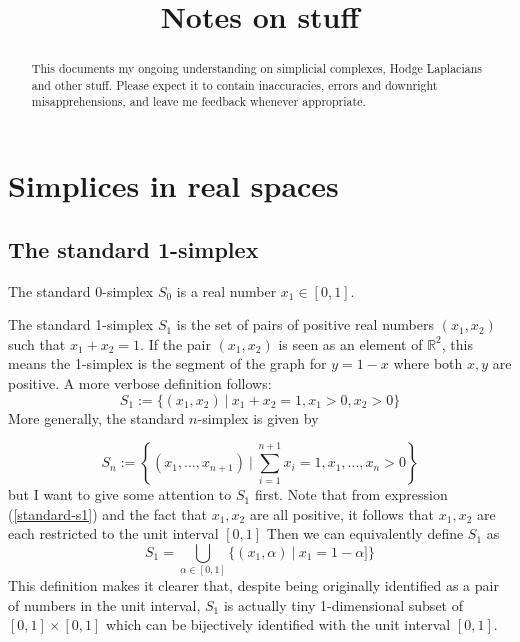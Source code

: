 \documentclass{tufte-handout}
\title{Notes on stuff}
\author[Diego Navarro}
\date{}
\newcommand{\re}{\mathbb{R}}
\begin{document}
\maketitle%

\begin{abstract}
\noindent This documents my ongoing understanding on simplicial complexes, Hodge Laplacians and other stuff. Please expect it to contain inaccuracies, errors and downright misapprehensions, and leave me feedback whenever appropriate. 
\end{abstract}

\section{Simplices in real spaces}

\subsection{The standard 1-simplex}
The standard 0-simplex $S_0$ is a real number $x_1\in[0,1]$.

The standard 1-simplex $S_1$ is the set of pairs of positive real numbers $(x_1,x_2)$ such that $x_1+x_2=1$. If the pair $(x_1, x_2)$ is seen as an element of $\re^2$, this means the 1-simplex is the segment of the graph for $y=1-x$ where both $x,y$ are positive. A more verbose definition follows:
\begin{equation}
    S_1 := \{(x_1,x_2)\ |\ x_1+x_2=1, x_1>0, x_2>0\}
\label{standard-s1}
\end{equation}
More generally, the standard $n$-simplex is given by

\begin{equation}
    S_n := \left\{(x_1,\ldots,x_{n+1})\ |\ \sum_{i=1}^{n+1} x_i = 1, x_1,...,x_n >0 \right\}
\label{standard-sn}
\end{equation}
but I want to give some attention to $S_1$ first.
Note that from expression (\ref{standard-s1}) and the fact that $x_1,x_2$ are all positive, it follows that $x_1,x_2$ are each restricted to the unit interval $[0,1]$ Then we can equivalently define $S_1$ as
\begin{equation}
    S_1 = \bigcup_{\alpha\in [0,1]} \{{(x_1,\alpha)}\ |\ x_1 = 1-\alpha]\}
\label{union-1}
\end{equation}
This definition makes it clearer that, despite being originally identified as a pair of numbers in the unit interval, $S_1$ is actually tiny 1-dimensional subset of $[0,1]\times[0,1]$ which can be bijectively identified with the unit interval $[0,1]$. 
\end{document}
